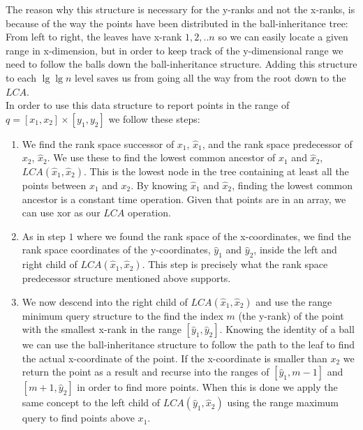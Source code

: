 The reason why this structure is necessary for the y-ranks and not the x-ranks, is because of the way the points have been distributed in the ball-inheritance tree: From left to right, the leaves have x-rank $1,2,..n$ so we can easily locate a given range in x-dimension, but in order to keep track of the y-dimensional range we need to follow the balls down the ball-inheritance structure. Adding this structure to each $\lg \lg n$ level saves us from going all the way from the root down to the $LCA$.  \\

In order to use this data structure to report points in the range of $q = [x_1, x_2] \times [y_1, y_2]$ we follow these steps:
\begin{enumerate}
  \item We find the rank space successor of $x_1$, $\hat{x}_1$, and the rank space predecessor of $x_2$, $\hat{x}_2$. We use these to find the lowest common ancestor of $\hat{x}_1$ and $\hat{x}_2$, $LCA(\hat{x}_1, \hat{x}_2)$. This is the lowest node in the tree containing at least all the points between $x_1$ and $x_2$. By knowing $\hat{x}_1$ and $\hat{x}_2$, finding the lowest common ancestor is a constant time operation. Given that points are in an array, we can use xor as our $LCA$ operation. 
  \item As in step $1$ where we found the rank space of the x-coordinates, we find the rank space coordinates of the y-coordinates, $\hat{y}_1$ and $\hat{y}_2$, inside the left and right child of $LCA(\hat{x}_1, \hat{x}_2)$. This step is precisely what the rank space predecessor structure mentioned above supports.
  \item We now descend into the right child of $LCA(\hat{x}_1, \hat{x}_2)$ and use the range minimum query structure to the find the index $m$ (the y-rank) of the point with the smallest x-rank in the range $[\hat{y}_1, \hat{y}_2]$. Knowing the identity of a ball we can use the ball-inheritance structure to follow the path to the leaf to find the actual x-coordinate of the point. If the x-coordinate is smaller than $x_2$ we return the point as a result and recurse into the ranges of $[\hat{y}_1, m-1]$ and $[m+1, \hat{y}_2]$ in order to find more points. When this is done we apply the same concept to the left child of $LCA(\hat{y}_1, \hat{x}_2)$ using the range maximum query to find points above $x_1$.
\end{enumerate}


